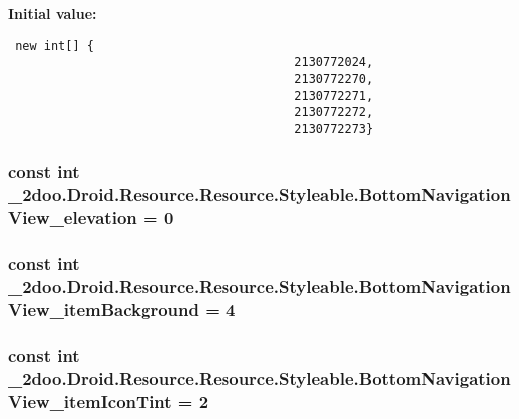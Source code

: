 \textbf{Initial value:}

\begin{Code}\begin{verbatim} new int[] {
                                        2130772024,
                                        2130772270,
                                        2130772271,
                                        2130772272,
                                        2130772273}
\end{verbatim}
\end{Code}
\hypertarget{class__2doo_1_1_droid_1_1_resource_1_1_styleable_921741984446d0366cf7f6b3da4e81b9}{
\subsubsection[{BottomNavigationView\_\-elevation}]{\setlength{\rightskip}{0pt plus 5cm}const int \_\-2doo.Droid.Resource.Resource.Styleable.BottomNavigationView\_\-elevation = 0}}
\label{class__2doo_1_1_droid_1_1_resource_1_1_styleable_921741984446d0366cf7f6b3da4e81b9}


\hypertarget{class__2doo_1_1_droid_1_1_resource_1_1_styleable_db2596b66c8ca067af314cdd7916b0a3}{
\subsubsection[{BottomNavigationView\_\-itemBackground}]{\setlength{\rightskip}{0pt plus 5cm}const int \_\-2doo.Droid.Resource.Resource.Styleable.BottomNavigationView\_\-itemBackground = 4}}
\label{class__2doo_1_1_droid_1_1_resource_1_1_styleable_db2596b66c8ca067af314cdd7916b0a3}


\hypertarget{class__2doo_1_1_droid_1_1_resource_1_1_styleable_d6bba5d82635842fd260c9f8db398349}{
\subsubsection[{BottomNavigationView\_\-itemIconTint}]{\setlength{\rightskip}{0pt plus 5cm}const int \_\-2doo.Droid.Resource.Resource.Styleable.BottomNavigationView\_\-itemIconTint = 2}}
\label{class__2doo_1_1_droid_1_1_resource_1_1_styleable_d6bba5d82635842fd260c9f8db398349}


